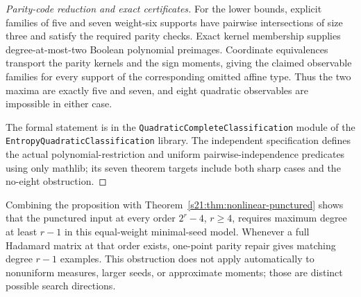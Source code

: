 \begin{proof}[Parity-code reduction and exact certificates]
For the lower bounds, explicit families of five and seven weight-six
supports have pairwise intersections of size three and satisfy the
required parity checks. Exact kernel membership supplies degree-at-most-two
Boolean polynomial preimages. Coordinate equivalences transport the
parity kernels and the sign moments, giving the claimed observable
families for every support of the corresponding omitted affine type.
Thus the two maxima are exactly five and seven, and eight quadratic
observables are impossible in either case.

The formal statement is in the
\texttt{QuadraticCompleteClassification} module of the
\texttt{EntropyQuadraticClassification} library.
The independent specification defines the actual polynomial-restriction
and uniform pairwise-independence predicates using only mathlib; its
seven theorem targets include both sharp cases and the no-eight
obstruction.
\end{proof}
Combining the proposition with Theorem~\ref{s21:thm:nonlinear-punctured}
shows that the punctured input at every order $2^r-4$, $r\ge4$, requires
maximum degree at least $r-1$ in this equal-weight minimal-seed model.
Whenever a full Hadamard matrix at that order exists, one-point parity
repair gives matching degree $r-1$ examples. This obstruction does not
apply automatically to nonuniform measures, larger seeds, or approximate
moments; those are distinct possible search directions.

